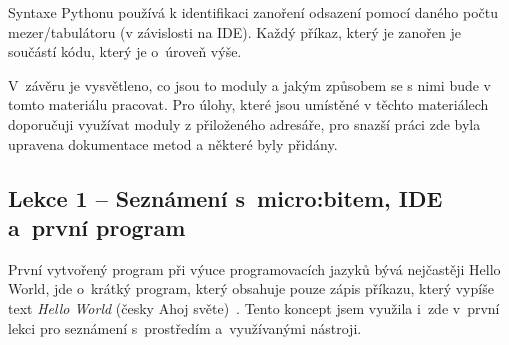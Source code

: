 \documentclass[
  digital,     %
  oneside,     %
  nosansbold,  %
  colorbold, %
  lof,         %
  nolot,         %
]{fithesis4}
\begin{document}
Syntaxe Pythonu používá k identifikaci zanoření odsazení pomocí daného počtu mezer/tabulátoru (v závislosti na IDE). Každý příkaz, který je zanořen je součástí kódu, který je o~úroveň výše.

V~závěru je vysvětleno, co jsou to moduly a jakým způsobem se s nimi bude v tomto materiálu pracovat. Pro úlohy, které jsou umístěné v těchto materiálech doporučuji využívat moduly z přiloženého adresáře, pro snazší práci zde byla upravena dokumentace metod a některé byly přidány.


\subsection{Lekce 1 -- Seznámení s~micro:bitem, IDE a~první program}
První vytvořený program při výuce programovacích jazyků bývá nejčastěji Hello World, jde o~krátký program, který obsahuje pouze zápis příkazu, který vypíše text \textit{Hello World} (česky Ahoj světe)~\cite{helloWorld}. Tento koncept jsem využila i~zde v~první lekci pro seznámení s~prostředím a~využívanými nástroji.
\end{document}
